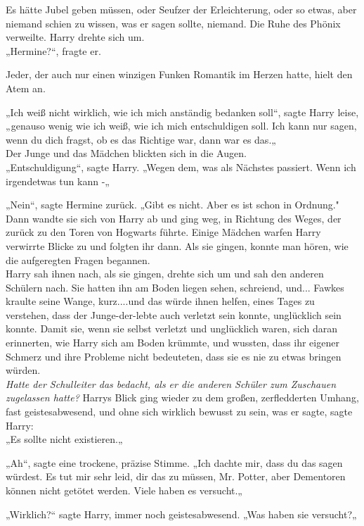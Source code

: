 {Es hätte Jubel geben müssen, oder Seufzer der Erleichterung, oder so etwas, aber niemand schien zu wissen, was er sagen sollte, niemand. Die Ruhe des Phönix verweilte. Harry drehte sich um.\\ „Hermine?“, fragte er.

Jeder, der auch nur einen winzigen Funken Romantik im Herzen hatte, hielt den Atem an.

„Ich weiß nicht wirklich, wie ich mich anständig bedanken soll“, sagte Harry leise, „genauso wenig wie ich weiß, wie ich mich entschuldigen soll. Ich kann nur sagen, wenn du dich fragst, ob es das Richtige war, dann war es das.„\\ Der Junge und das Mädchen blickten sich in die Augen.\\ „Entschuldigung“, sagte Harry. „Wegen dem, was als Nächstes passiert. Wenn ich irgendetwas tun kann -„

„Nein“, sagte Hermine zurück. „Gibt es nicht. Aber es ist schon in Ordnung."\\ Dann wandte sie sich von Harry ab und ging weg, in Richtung des Weges, der zurück zu den Toren von Hogwarts führte. Einige Mädchen warfen Harry verwirrte Blicke zu und folgten ihr dann. Als sie gingen, konnte man hören, wie die aufgeregten Fragen begannen.\\ Harry sah ihnen nach, als sie gingen, drehte sich um und sah den anderen Schülern nach. Sie hatten ihn am Boden liegen sehen, schreiend, und... Fawkes kraulte seine Wange, kurz....und das würde ihnen helfen, eines Tages zu verstehen, dass der Junge-der-lebte auch verletzt sein konnte, unglücklich sein konnte. Damit sie, wenn sie selbst verletzt und unglücklich waren, sich daran erinnerten, wie Harry sich am Boden krümmte, und wussten, dass ihr eigener Schmerz und ihre Probleme nicht bedeuteten, dass sie es nie zu etwas bringen würden.\\ \emph{\hfill\break Hatte der Schulleiter das bedacht, als er die anderen Schüler zum Zuschauen zugelassen hatte?} Harrys Blick ging wieder zu dem großen, zerfledderten Umhang, fast geistesabwesend, und ohne sich wirklich bewusst zu sein, was er sagte, sagte Harry:\\ „Es sollte nicht existieren.„

„Ah“, sagte eine trockene, präzise Stimme. „Ich dachte mir, dass du das sagen würdest. Es tut mir sehr leid, dir das zu müssen, Mr. Potter, aber Dementoren können nicht getötet werden. Viele haben es versucht.„

„Wirklich?“ sagte Harry, immer noch geistesabwesend. „Was haben sie versucht?„

}
